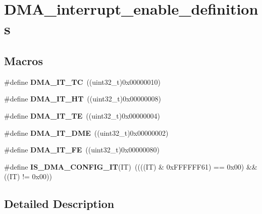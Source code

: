 \hypertarget{group___d_m_a__interrupt__enable__definitions}{}\section{D\+M\+A\+\_\+interrupt\+\_\+enable\+\_\+definitions}
\label{group___d_m_a__interrupt__enable__definitions}
\subsection*{Macros}
\begin{DoxyCompactItemize}
\item 
\hypertarget{group___d_m_a__interrupt__enable__definitions_ga06e83dd277e0d3e5635cf8ce8dfd6e16}{}\#define {\bfseries D\+M\+A\+\_\+\+I\+T\+\_\+\+T\+C}~((uint32\+\_\+t)0x00000010)\label{group___d_m_a__interrupt__enable__definitions_ga06e83dd277e0d3e5635cf8ce8dfd6e16}

\item 
\hypertarget{group___d_m_a__interrupt__enable__definitions_gadf11c572b9797e04a14b105fdc2e5f66}{}\#define {\bfseries D\+M\+A\+\_\+\+I\+T\+\_\+\+H\+T}~((uint32\+\_\+t)0x00000008)\label{group___d_m_a__interrupt__enable__definitions_gadf11c572b9797e04a14b105fdc2e5f66}

\item 
\hypertarget{group___d_m_a__interrupt__enable__definitions_gaf9d92649d2a0146f663ff253d8f3b59e}{}\#define {\bfseries D\+M\+A\+\_\+\+I\+T\+\_\+\+T\+E}~((uint32\+\_\+t)0x00000004)\label{group___d_m_a__interrupt__enable__definitions_gaf9d92649d2a0146f663ff253d8f3b59e}

\item 
\hypertarget{group___d_m_a__interrupt__enable__definitions_ga71137443f7bdced1ee80697596e9ea98}{}\#define {\bfseries D\+M\+A\+\_\+\+I\+T\+\_\+\+D\+M\+E}~((uint32\+\_\+t)0x00000002)\label{group___d_m_a__interrupt__enable__definitions_ga71137443f7bdced1ee80697596e9ea98}

\item 
\hypertarget{group___d_m_a__interrupt__enable__definitions_ga93164ec039fc5579662c382e68d7d13f}{}\#define {\bfseries D\+M\+A\+\_\+\+I\+T\+\_\+\+F\+E}~((uint32\+\_\+t)0x00000080)\label{group___d_m_a__interrupt__enable__definitions_ga93164ec039fc5579662c382e68d7d13f}

\item 
\hypertarget{group___d_m_a__interrupt__enable__definitions_ga47f6af7da302c19aba24516037d305e7}{}\#define {\bfseries I\+S\+\_\+\+D\+M\+A\+\_\+\+C\+O\+N\+F\+I\+G\+\_\+\+I\+T}(I\+T)~((((I\+T) \& 0x\+F\+F\+F\+F\+F\+F61) == 0x00) \&\& ((\+I\+T) != 0x00))\label{group___d_m_a__interrupt__enable__definitions_ga47f6af7da302c19aba24516037d305e7}

\end{DoxyCompactItemize}


\subsection{Detailed Description}
